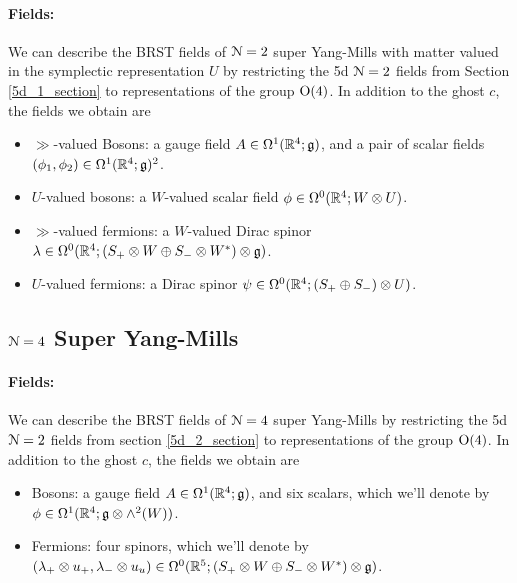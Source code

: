\documentclass[10pt, oneside]{article}
\begin{document}
\vspace{-10pt}
\paragraph{Fields:}  We can describe the BRST fields of $\mathcal{N}=2$ super Yang-Mills with matter valued in the symplectic representation $U$ by restricting the 5d $\mathcal{N}=2$ fields from Section \ref{5d_1_section} to representations of the group $\mathrm{O}(4)$.  In addition to the ghost $c$, the fields we obtain are
\begin{itemize}
 \item $\gg$-valued Bosons: a gauge field $A \in \Omega^1(\mathbb R^4; \mathfrak{g})$, and a pair of scalar fields $(\phi_1,\phi_2) \in \Omega^1(\mathbb R^4; \mathfrak{g})^2$.
 \item $U$-valued bosons: a $W$-valued scalar field $\phi \in \Omega^0(\mathbb R^4; W \otimes U)$.
 \item $\gg$-valued fermions: a $W$-valued Dirac spinor $\lambda \in \Omega^0(\mathbb R^4; (S_+ \otimes W \oplus S_- \otimes W^*) \otimes \mathfrak{g})$.
 \item $U$-valued fermions: a Dirac spinor $\psi \in \Omega^0(\mathbb R^4; (S_+\oplus S_-) \otimes U)$.
\end{itemize}


\subsection{$\mathcal N=4$ Super Yang-Mills}

\vspace{-10pt}
\paragraph{Fields:} We can describe the BRST fields of $\mathcal{N}=4$ super Yang-Mills by restricting the 5d $\mathcal{N}=2$ fields from section \ref{5d_2_section} to representations of the group $\mathrm{O}(4)$.  In addition to the ghost $c$, the fields we obtain are
\begin{itemize}
 \item Bosons: a gauge field $A \in \Omega^1(\mathbb R^4; \mathfrak{g})$, and six scalars, which we'll denote by $\phi \in \Omega^1(\mathbb R^4; \mathfrak{g} \otimes \wedge^2(W))$.
 \item Fermions: four spinors, which we'll denote by $(\lambda_+ \otimes u_+, \lambda_- \otimes u_u) \in \Omega^0(\mathbb R^5; (S_+ \otimes W \oplus S_- \otimes W^*) \otimes \mathfrak{g})$.
\end{itemize}

\vspace{-10pt}
\end{document}
